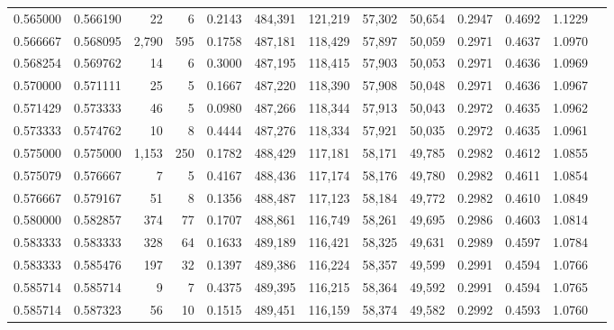\begin{tabular}{rrrrrrrrrrrrr}
0.565000 & 0.566190 &     22 &      6 &                                     0.2143 & 484,391 & 121,219 &  57,302 &  50,654 & 0.2947 & 0.4692 & 1.1229 \\
0.566667 & 0.568095 &  2,790 &    595 &                                     0.1758 & 487,181 & 118,429 &  57,897 &  50,059 & 0.2971 & 0.4637 & 1.0970 \\
0.568254 & 0.569762 &     14 &      6 &                                     0.3000 & 487,195 & 118,415 &  57,903 &  50,053 & 0.2971 & 0.4636 & 1.0969 \\
0.570000 & 0.571111 &     25 &      5 &                                     0.1667 & 487,220 & 118,390 &  57,908 &  50,048 & 0.2971 & 0.4636 & 1.0967 \\
0.571429 & 0.573333 &     46 &      5 &                                     0.0980 & 487,266 & 118,344 &  57,913 &  50,043 & 0.2972 & 0.4635 & 1.0962 \\
0.573333 & 0.574762 &     10 &      8 &                                     0.4444 & 487,276 & 118,334 &  57,921 &  50,035 & 0.2972 & 0.4635 & 1.0961 \\
0.575000 & 0.575000 &  1,153 &    250 &                                     0.1782 & 488,429 & 117,181 &  58,171 &  49,785 & 0.2982 & 0.4612 & 1.0855 \\
0.575079 & 0.576667 &      7 &      5 &                                     0.4167 & 488,436 & 117,174 &  58,176 &  49,780 & 0.2982 & 0.4611 & 1.0854 \\
0.576667 & 0.579167 &     51 &      8 &                                     0.1356 & 488,487 & 117,123 &  58,184 &  49,772 & 0.2982 & 0.4610 & 1.0849 \\
0.580000 & 0.582857 &    374 &     77 &                                     0.1707 & 488,861 & 116,749 &  58,261 &  49,695 & 0.2986 & 0.4603 & 1.0814 \\
0.583333 & 0.583333 &    328 &     64 &                                     0.1633 & 489,189 & 116,421 &  58,325 &  49,631 & 0.2989 & 0.4597 & 1.0784 \\
0.583333 & 0.585476 &    197 &     32 &                                     0.1397 & 489,386 & 116,224 &  58,357 &  49,599 & 0.2991 & 0.4594 & 1.0766 \\
0.585714 & 0.585714 &      9 &      7 &                                     0.4375 & 489,395 & 116,215 &  58,364 &  49,592 & 0.2991 & 0.4594 & 1.0765 \\
0.585714 & 0.587323 &     56 &     10 &                                     0.1515 & 489,451 & 116,159 &  58,374 &  49,582 & 0.2992 & 0.4593 & 1.0760 \\

\end{tabular}
